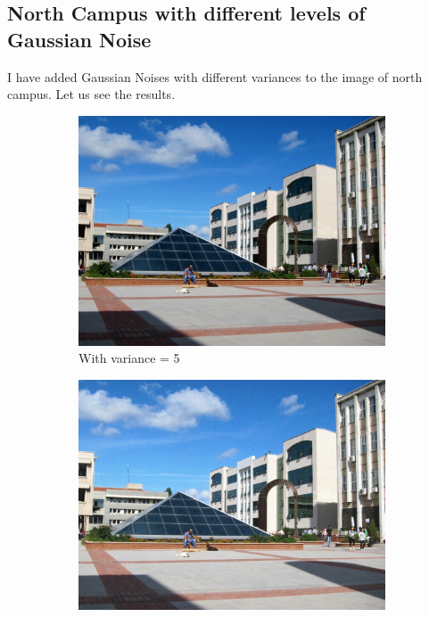 \documentclass[12pt]{article}
\begin{document}
\subsection{North Campus with different levels of Gaussian Noise}
I have added Gaussian Noises with different variances to the image of north campus. Let us see the results.

\begin{figure}[H]
    \centering
    \begin{subfigure}{0.45\textwidth}
        \centering
        \includegraphics[height=0.75\textwidth]{images/kuzey-var-5.jpg}
        \caption{With variance = 5}
        \label{noise-var-5}
    \end{subfigure}
    \begin{subfigure}{0.45\textwidth}
        \centering
        \includegraphics[height=0.75\textwidth]{images/kuzey-var-50.jpg}

\end{subfigure}
\end{figure}
\end{document}
